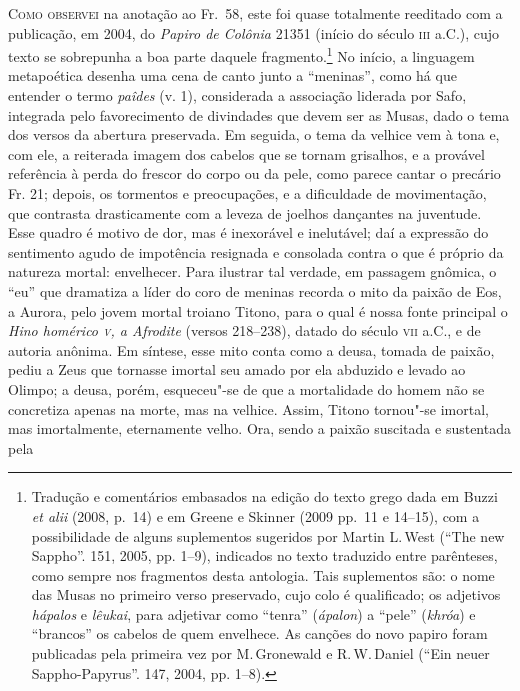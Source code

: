 {\textsc{Como observei} na anotação ao Fr.~58, este foi quase totalmente reeditado com a 
publicação, em 2004, do \textit{Papiro de Colônia} 21351 (início do século \textsc{iii} a.C.), 
cujo texto se sobrepunha a boa parte daquele fragmento.\footnote{Tradução e comentários embasados na edição do texto grego dada em Buzzi \textit{et alii} (2008, p.~14) e em Greene e Skinner (2009 pp.~11 e 14--15), com a possibilidade de alguns suplementos sugeridos por Martin L.\,West (``The new Sappho''. \textit{} 151, 2005, pp. 1--9), indicados no texto traduzido entre parênteses, como sempre nos fragmentos desta antologia. Tais suplementos são: o nome das Musas no primeiro verso preservado, cujo colo é qualificado; os adjetivos \textit{hápalos} e \textit{lêukai}, para adjetivar como ``tenra'' (\textit{ápalon}) a ``pele'' (\textit{khróa}) e ``brancos'' os cabelos de quem envelhece. As canções do novo papiro foram publicadas pela primeira vez por M.\,Gronewald e R.\,W.\,Daniel (``Ein neuer Sappho-Papyrus''. \textit{} 147, 2004, pp. 1--8).} No início, a 
linguagem metapoética desenha uma cena de canto junto a ``meninas'', como há que entender o termo \textit{paîdes} (v. 1), considerada a associação liderada por Safo, 
integrada pelo favorecimento de divindades que devem ser as Musas,
dado o tema dos versos da abertura preservada. Em seguida, o tema da velhice
vem à tona e, com ele, a reiterada imagem dos cabelos que se tornam grisalhos,
e a provável referência à perda do frescor do corpo ou da pele, como parece cantar o precário Fr. 21; depois, os
tormentos e preocupações, e a dificuldade de movimentação, que contrasta
drasticamente com a leveza de joelhos dançantes na juventude. Esse quadro é
motivo de dor, mas é inexorável e inelutável; daí a expressão do sentimento
agudo de impotência resignada e consolada contra o que é próprio da natureza mortal: envelhecer. Para
ilustrar tal verdade, em passagem gnômica, o “eu” que dramatiza a líder do coro de meninas recorda o
mito da paixão de Eos, a Aurora, pelo jovem mortal troiano Titono, para o qual é nossa fonte
principal o \textit{Hino homérico \textsc{v}, a Afrodite }(versos 218--238), datado do
século \textsc{vii} a.C., e de autoria anônima. Em síntese, esse mito conta como a
deusa, tomada de paixão, pediu a Zeus que tornasse imortal seu amado por ela abduzido e levado ao Olimpo; a deusa,
porém, esqueceu"-se de que a mortalidade do homem não se concretiza apenas na
morte, mas na velhice. Assim, Titono tornou"-se imortal, mas imortalmente,
eternamente velho. Ora, sendo a paixão suscitada e sustentada pela
}
